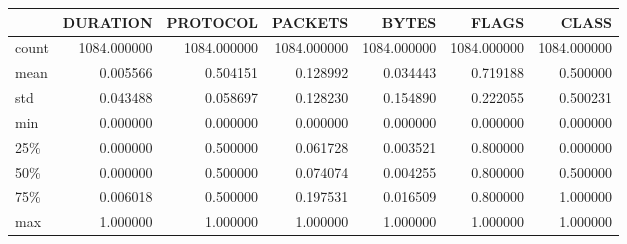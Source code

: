 \begin{tabular}{lrrrrrr}
\toprule
{} &     DURATION &     PROTOCOL &      PACKETS &        BYTES &        FLAGS &        CLASS \\
\midrule
count &  1084.000000 &  1084.000000 &  1084.000000 &  1084.000000 &  1084.000000 &  1084.000000 \\
mean  &     0.005566 &     0.504151 &     0.128992 &     0.034443 &     0.719188 &     0.500000 \\
std   &     0.043488 &     0.058697 &     0.128230 &     0.154890 &     0.222055 &     0.500231 \\
min   &     0.000000 &     0.000000 &     0.000000 &     0.000000 &     0.000000 &     0.000000 \\
25\%   &     0.000000 &     0.500000 &     0.061728 &     0.003521 &     0.800000 &     0.000000 \\
50\%   &     0.000000 &     0.500000 &     0.074074 &     0.004255 &     0.800000 &     0.500000 \\
75\%   &     0.006018 &     0.500000 &     0.197531 &     0.016509 &     0.800000 &     1.000000 \\
max   &     1.000000 &     1.000000 &     1.000000 &     1.000000 &     1.000000 &     1.000000 \\
\bottomrule
\end{tabular}
